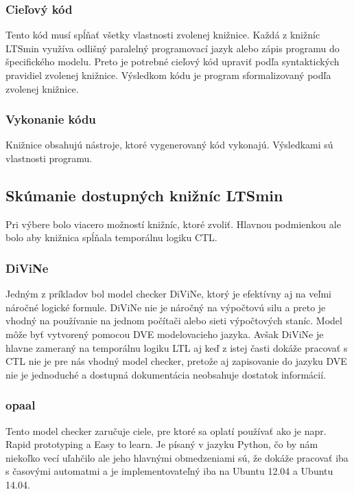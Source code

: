 \subsubsection{Cieľový kód}
Tento kód musí spĺňať všetky vlastnosti zvolenej knižnice. Každá z knižníc LTSmin využíva odlišný 
paralelný programovací jazyk alebo zápis programu do špecifického modelu. Preto je potrebné cieľový kód 
upraviť podľa syntaktických pravidiel zvolenej knižnice. Výsledkom kódu je program sformalizovaný podľa 
zvolenej knižnice.

\subsubsection{Vykonanie kódu}
Knižnice obsahujú nástroje, ktoré vygenerovaný kód vykonajú. Výsledkami sú vlastnosti programu.

\subsection{Skúmanie dostupných knižníc LTSmin}
Pri výbere bolo viacero možností knižníc, ktoré zvoliť. Hlavnou podmienkou ale bolo aby knižnica spĺňala 
temporálnu logiku CTL. 

\subsubsection{DiViNe}
Jedným z príkladov bol model checker DiViNe, ktorý je efektívny aj na veľmi náročné 
logické formule. DiViNe nie je náročný na výpočtovú silu a preto je vhodný na používanie na jednom 
počítači alebo sieti výpočtových staníc. Model môže byť vytvorený pomocou DVE modelovacieho jazyka. 
Avšak DiViNe je hlavne zameraný na temporálnu logiku LTL aj keď z istej časti dokáže pracovať s CTL 
nie je pre nás vhodný model checker, pretože aj zapisovanie do jazyku DVE nie je jednoduché a dostupná 
dokumentácia neobsahuje dostatok informácií.

\subsubsection{opaal}
Tento model checker zaručuje ciele, pre ktoré sa oplatí používať ako je napr.
Rapid prototyping a Easy to learn. Je písaný v jazyku Python, čo by nám niekoľko vecí 
uľahčilo ale jeho hlavnými obmedzeniami sú, že dokáže pracovať iba s časovými automatmi 
a je implementovateľný iba na Ubuntu 12.04 a Ubuntu 14.04.

